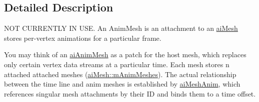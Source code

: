 \subsection{Detailed Description}
N\-O\-T C\-U\-R\-R\-E\-N\-T\-L\-Y I\-N U\-S\-E. An Anim\-Mesh is an attachment to an \hyperlink{structai_mesh}{ai\-Mesh} stores per-\/vertex animations for a particular frame. 

You may think of an \hyperlink{structai_anim_mesh}{ai\-Anim\-Mesh} as a {\ttfamily patch} for the host mesh, which replaces only certain vertex data streams at a particular time. Each mesh stores n attached attached meshes (\hyperlink{structai_mesh_a5078f7db7e99ed05db89dfa412f0e990}{ai\-Mesh\-::m\-Anim\-Meshes}). The actual relationship between the time line and anim meshes is established by \hyperlink{structai_mesh_anim}{ai\-Mesh\-Anim}, which references singular mesh attachments by their I\-D and binds them to a time offset. 

